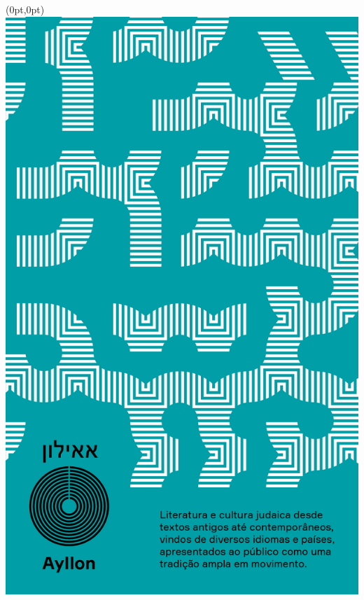 \pagestyle{ayllon}
\label{ayllon}


\begin{textblock*}{5.625in}(0pt,0pt)%
\vspace*{-2.5cm}
\hspace*{-1.75cm}\includegraphics*[width=147mm]{./imgs/AYLLON.png}
\end{textblock*}

\pagebreak

\hspace{.5cm}

